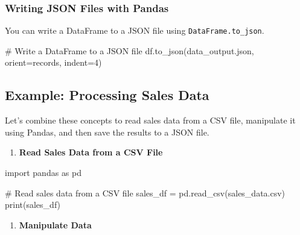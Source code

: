 \documentclass[
  letterpaper,
  DIV=11,
  numbers=noendperiod]{scrreprt}
\newenvironment{Shaded}{\begin{snugshade}}{\end{snugshade}}
\newcommand{\BuiltInTok}[1]{\textcolor[rgb]{0.00,0.23,0.31}{#1}}
\newcommand{\CommentTok}[1]{\textcolor[rgb]{0.37,0.37,0.37}{#1}}
\newcommand{\DecValTok}[1]{\textcolor[rgb]{0.68,0.00,0.00}{#1}}
\newcommand{\ImportTok}[1]{\textcolor[rgb]{0.00,0.46,0.62}{#1}}
\newcommand{\NormalTok}[1]{\textcolor[rgb]{0.00,0.23,0.31}{#1}}
\newcommand{\OperatorTok}[1]{\textcolor[rgb]{0.37,0.37,0.37}{#1}}
\newcommand{\StringTok}[1]{\textcolor[rgb]{0.13,0.47,0.30}{#1}}
\providecommand{\tightlist}{%
  \setlength{\itemsep}{0pt}\setlength{\parskip}{0pt}}\usepackage{longtable,booktabs,array}
\begin{document}
\subsubsection{Writing JSON Files with
Pandas}\label{writing-json-files-with-pandas}

You can write a DataFrame to a JSON file using
\texttt{DataFrame.to\_json}.

\begin{Shaded}
\begin{Highlighting}[]
\CommentTok{\# Write a DataFrame to a JSON file}
\NormalTok{df.to\_json(}\StringTok{\textquotesingle{}data\_output.json\textquotesingle{}}\NormalTok{, orient}\OperatorTok{=}\StringTok{\textquotesingle{}records\textquotesingle{}}\NormalTok{, indent}\OperatorTok{=}\DecValTok{4}\NormalTok{)}
\end{Highlighting}
\end{Shaded}

\subsection{Example: Processing Sales
Data}\label{example-processing-sales-data}

Let's combine these concepts to read sales data from a CSV file,
manipulate it using Pandas, and then save the results to a JSON file.

\begin{enumerate}
\def\labelenumi{\arabic{enumi}.}
\tightlist
\item
  \textbf{Read Sales Data from a CSV File}
\end{enumerate}

\begin{Shaded}
\begin{Highlighting}[]
\ImportTok{import}\NormalTok{ pandas }\ImportTok{as}\NormalTok{ pd}

\CommentTok{\# Read sales data from a CSV file}
\NormalTok{sales\_df }\OperatorTok{=}\NormalTok{ pd.read\_csv(}\StringTok{\textquotesingle{}sales\_data.csv\textquotesingle{}}\NormalTok{)}
\BuiltInTok{print}\NormalTok{(sales\_df)}
\end{Highlighting}
\end{Shaded}

\begin{enumerate}
\def\labelenumi{\arabic{enumi}.}
\setcounter{enumi}{1}
\tightlist
\item
  \textbf{Manipulate Data}
\end{enumerate}
\end{document}
